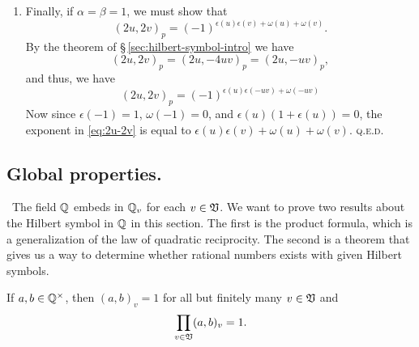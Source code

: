 \begin{enumerate}[nosep, label=(\roman*), wide]
    \item Finally, if \(\alpha = \beta = 1\), we must show that
    \[
    (2u, 2v)_p = (-1)^{\epsilon(u)\epsilon(v) + \omega(u) + \omega(v)}.
    \]
    By the theorem of \S\,\ref{sec:hilbert-symbol-intro} we have
    \[
    (2u, 2v)_p = (2u, -4uv)_p = (2u, -uv)_p,
    \]
    and thus, we have
    \begin{equation}
    (2u, 2v)_p = (-1)^{\epsilon(u)\epsilon(-uv) + \omega(-uv)}
    \label{eq:2u-2v}
    \end{equation}
    Now since \(\epsilon(-1) = 1\), \(\omega(-1) = 0\), and \(\epsilon(u) (1 +
    \epsilon(u)) = 0\), the exponent in \eqref{eq:2u-2v} is equal to
    \(\epsilon(u)\epsilon(v) + \omega(u) + \omega(v)\). \scshape{q.e.d.}
\end{enumerate}




\subsection{Global properties.}\label{sec:hilbert-reciprocity}~The field
\(\mathbb{Q}\) embeds in \(\mathbb{Q}_v\) for each \(v \in \mathfrak{V}\). We want to
prove two results about the Hilbert symbol in \(\mathbb{Q}\) in this section.
The first is the product formula, which is a generalization of the law of
quadratic reciprocity. The second is a theorem that gives us a way to determine
whether rational numbers exists with given Hilbert symbols.

\begin{theoremx}
    If \(a, b \in \mathbb{Q}^{\times}\), then \((a, b)_v = 1\) for all but
    finitely many \(v \in \mathfrak{V}\) and 
    \[
        \prod_{v \in \mathfrak{V}} (a, b)_v = 1.
    \]
\end{theoremx}

